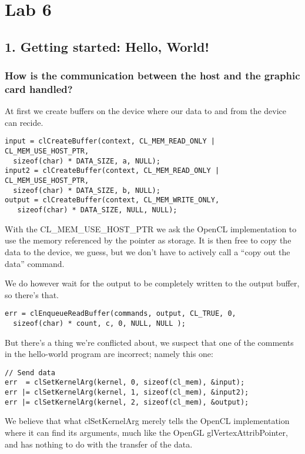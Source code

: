\documentclass[a4paper,12pt]{article}
\begin{document}
\section{Lab 6}


\subsection{1. Getting started: Hello, World!}

\subsubsection{How is the communication between the host and the graphic card handled?}

At first we create buffers on the device where our data to and from the device can recide.

\begin{lstlisting}[caption= Uploading data]
input = clCreateBuffer(context, CL_MEM_READ_ONLY | CL_MEM_USE_HOST_PTR,
  sizeof(char) * DATA_SIZE, a, NULL);
input2 = clCreateBuffer(context, CL_MEM_READ_ONLY | CL_MEM_USE_HOST_PTR,
  sizeof(char) * DATA_SIZE, b, NULL);
output = clCreateBuffer(context, CL_MEM_WRITE_ONLY,
   sizeof(char) * DATA_SIZE, NULL, NULL);
\end{lstlisting}
\noindent
With the CL\_MEM\_USE\_HOST\_PTR we ask the OpenCL implementation to use the memory referenced by the pointer as storage. It is then free to copy the data to the device, we guess, but we don't have to actively call a ``copy out the data'' command.

We do however wait for the output to be completely written to the output buffer, so there's that.

\begin{lstlisting}[caption= Reading the output]
err = clEnqueueReadBuffer(commands, output, CL_TRUE, 0,
  sizeof(char) * count, c, 0, NULL, NULL );
\end{lstlisting}
\noindent
But there's a thing we're conflicted about, we suspect that one of the comments in the hello-world program are incorrect; namely this one:

\begin{lstlisting}[caption= Setting kernel arguments]
// Send data
err  = clSetKernelArg(kernel, 0, sizeof(cl_mem), &input);
err |= clSetKernelArg(kernel, 1, sizeof(cl_mem), &input2);
err |= clSetKernelArg(kernel, 2, sizeof(cl_mem), &output);
\end{lstlisting}
\noindent
We believe that what clSetKernelArg merely tells the OpenCL implementation where it can find its arguments, much like the OpenGL glVertexAttribPointer, and has nothing to do with the transfer of the data.
\end{document}
